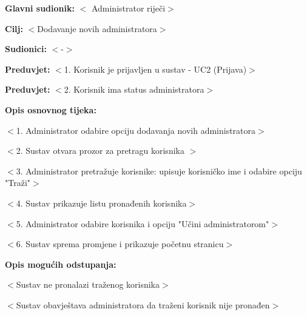 					\noindent {}
				\begin{packed_item}
					
					\item \textbf{Glavni sudionik: }$<$ Administrator riječi$>$
					\item  \textbf{Cilj:} $<$Dodavanje novih administratora$>$
					\item  \textbf{Sudionici:} $<$-$>$
					\item  \textbf{Preduvjet:} $<$1. Korisnik je prijavljen u sustav - UC2 (Prijava)$>$
					\item  \textbf{Preduvjet:} $<$2. Korisnik ima status administratora$>$
					\item  \textbf{Opis osnovnog tijeka:}
					
					\item[] \begin{packed_enum}
						
						\item $<$1. Administrator odabire opciju dodavanja novih administratora$>$
						\item $<$2. Sustav otvara prozor za pretragu korisnika $>$
						\item $<$3. Administrator pretražuje korisnike: upisuje korisničko ime i odabire opciju "Traži"$>$
						\item $<$4. Sustav prikazuje listu pronađenih korisnika$>$
						\item $<$5. Administrator odabire korisnika i opciju "Učini administratorom"$>$
						\item $<$6. Sustav sprema promjene i prikazuje početnu stranicu$>$
					\end{packed_enum}
					
					\item  \textbf{Opis mogućih odstupanja:}
					
					\item[] \begin{packed_item}
						
						\item[4.a] $<$Sustav ne pronalazi traženog korisnika$>$
						\item[] \begin{packed_enum}
							
							\item $<$Sustav obavještava administratora da traženi korisnik nije pronađen$>$
							
						\end{packed_enum}
						
					\end{packed_item}
				\end{packed_item}
				
